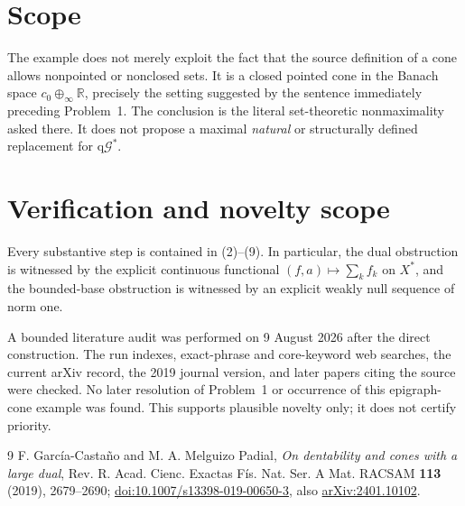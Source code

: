\documentclass[11pt]{article}
\newcommand{\R}{\mathbb R}
\newcommand{\qG}{\mathrm{q}\mathcal G^*}
\begin{document}
\section{Scope}

The example does not merely exploit the fact that the source definition of
a cone allows nonpointed or nonclosed sets.  It is a closed pointed cone in
the Banach space $c_0\oplus_\infty\R$, precisely the setting suggested by the
sentence immediately preceding Problem~1.  The conclusion is the literal
set-theoretic nonmaximality asked there.  It does not propose a maximal
\emph{natural} or structurally defined replacement for $\qG$.

\section{Verification and novelty scope}

Every substantive step is contained in (2)--(9).  In particular, the dual
obstruction is witnessed by the explicit continuous functional
$(f,a)\mapsto\sum_k f_k$ on $X^*$, and the bounded-base obstruction is
witnessed by an explicit weakly null sequence of norm one.

A bounded literature audit was performed on 9 August 2026 after the direct
construction.  The run indexes, exact-phrase and core-keyword web searches,
the current arXiv record, the 2019 journal version, and later papers citing
the source were checked.  No later resolution of Problem~1 or occurrence of
this epigraph-cone example was found.  This supports plausible novelty only;
it does not certify priority.

\begin{thebibliography}{9}
F. Garc\'ia-Casta\~no and M. A. Melguizo Padial,
\emph{On dentability and cones with a large dual},
Rev. R. Acad. Cienc. Exactas F\'is. Nat. Ser. A Mat. RACSAM
\textbf{113} (2019), 2679--2690;
\href{https://doi.org/10.1007/s13398-019-00650-3}{doi:10.1007/s13398-019-00650-3},
also \href{https://arxiv.org/abs/2401.10102}{arXiv:2401.10102}.
\end{thebibliography}
\end{document}
